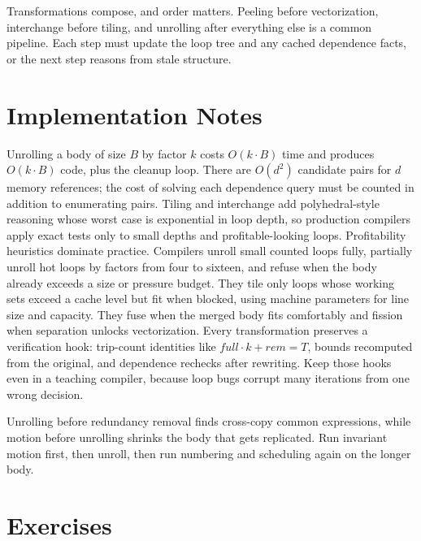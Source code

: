 Transformations compose, and order matters.
Peeling before vectorization, interchange before tiling, and unrolling after everything else is a common pipeline.
Each step must update the loop tree and any cached dependence facts, or the next step reasons from stale structure.

\section{Implementation Notes}
\label{sec:ch19-implementation}

Unrolling a body of size $B$ by factor $k$ costs $O(k \cdot B)$ time and produces $O(k \cdot B)$ code, plus the cleanup loop.
There are $O(d^2)$ candidate pairs for $d$ memory references; the cost of solving each dependence query must be counted in addition to enumerating pairs.
Tiling and interchange add polyhedral-style reasoning whose worst case is exponential in loop depth, so production compilers apply exact tests only to small depths and profitable-looking loops.
Profitability heuristics dominate practice.
Compilers unroll small counted loops fully, partially unroll hot loops by factors from four to sixteen, and refuse when the body already exceeds a size or pressure budget.
They tile only loops whose working sets exceed a cache level but fit when blocked, using machine parameters for line size and capacity.
They fuse when the merged body fits comfortably and fission when separation unlocks vectorization.
Every transformation preserves a verification hook: trip-count identities like $full \cdot k + rem = T$, bounds recomputed from the original, and dependence rechecks after rewriting.
Keep those hooks even in a teaching compiler, because loop bugs corrupt many iterations from one wrong decision.

\begin{ccnote}
Unrolling before redundancy removal finds cross-copy common expressions, while motion before unrolling shrinks the body that gets replicated.
Run invariant motion first, then unroll, then run numbering and scheduling again on the longer body.
\end{ccnote}

\section{Exercises}
\label{sec:ch19-exercises}

